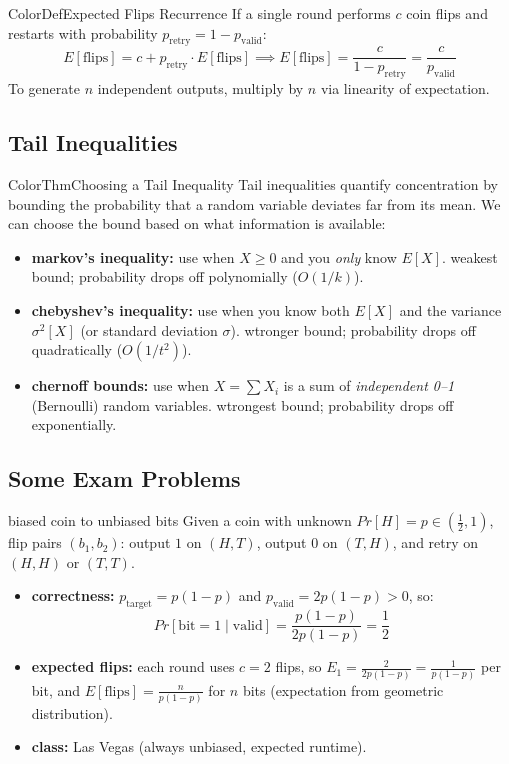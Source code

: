 \documentclass[a4paper, 11pt]{report}
\begin{document}
\begin{cframe}{ColorDef}{Expected Flips Recurrence}{}
    If a single round performs $c$ coin flips and restarts with probability $p_{\text{retry}} = 1 - p_{\text{valid}}$:
    $$E[\text{flips}] = c + p_{\text{retry}} \cdot E[\text{flips}] \implies E[\text{flips}] = \frac{c}{1 - p_{\text{retry}}} = \frac{c}{p_{\text{valid}}}$$
    To generate $n$ independent outputs, multiply by $n$ via linearity of expectation.
\end{cframe}


\subsection*{Tail Inequalities}

\begin{cframe}{ColorThm}{Choosing a Tail Inequality}
Tail inequalities quantify concentration by bounding the probability that a random variable deviates far from its mean. We can choose the bound based on what information is available:
\begin{itemize}
    \item \textbf{markov's inequality:} use when $X \ge 0$ and you \textit{only} know $E[X]$.
        \subitem weakest bound; probability drops off polynomially ($O(1/k)$).
    \item \textbf{chebyshev's inequality:} use when you know both $E[X]$ and the variance $\sigma^2[X]$ (or standard deviation $\sigma$).
        \subitem wtronger bound; probability drops off quadratically ($O(1/t^2)$).
    \item \textbf{chernoff bounds:} use when $X = \sum X_i$ is a sum of \textit{independent 0--1} (Bernoulli) random variables.
        \subitem wtrongest bound; probability drops off exponentially.
\end{itemize}
\end{cframe}

\subsection*{Some Exam Problems}

\begin{gframe}{biased coin to unbiased bits}
    Given a coin with unknown $Pr[H] = p \in (\frac{1}{2}, 1)$, flip pairs $(b_1, b_2)$: output $1$ on $(H,T)$, output $0$ on $(T,H)$, and retry on $(H,H)$ or $(T,T)$.
    \begin{itemize}
        \item \textbf{correctness:} $p_{\text{target}} = p(1-p)$ and $p_{\text{valid}} = 2p(1-p) > 0$, so:
            $$Pr[\text{bit} = 1 \mid \text{valid}] = \frac{p(1-p)}{2p(1-p)} = \frac{1}{2}$$
        \item \textbf{expected flips:} each round uses $c = 2$ flips, so $E_1 = \frac{2}{2p(1-p)} = \frac{1}{p(1-p)}$ per bit, and $E[\text{flips}] = \frac{n}{p(1-p)}$ for $n$ bits (expectation from geometric distribution).
        \item \textbf{class:} Las Vegas (always unbiased, expected runtime).
    \end{itemize}
\end{gframe}
\end{document}
